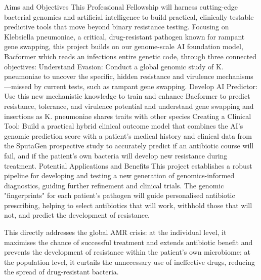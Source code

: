 Aims and Objectives
This Professional Fellowship will harness cutting-edge bacterial genomics and artificial intelligence to build practical, clinically testable predictive tools that move beyond binary resistance testing. Focusing on Klebsiella pneumoniae, a critical, drug-resistant pathogen known for rampant gene swapping, this project builds on our genome-scale AI foundation model, Bacformer which reads an infections entire genetic code, through three connected objectives:
Understand Evasion: Conduct a global genomic study of K. pneumoniae to uncover the specific, hidden resistance and virulence mechanisms—missed by current tests, such as rampant gene swapping.
Develop AI Predictor: Use this new mechanistic knowledge to train and enhance Bacformer to predict resistance, tolerance, and virulence potential and understand gene swapping and insertions as K. pneumoniae shares traits with other species 
Creating a Clinical Tool: Build a practical hybrid clinical outcome model that combines the AI's genomic prediction score with a patient's medical history and clinical data from the SputaGen prospective study to accurately predict if an antibiotic course will fail, and if the patient's own bacteria will develop new resistance during treatment.
Potential Applications and Benefits
This project establishes a robust pipeline for developing and testing a new generation of genomics-informed diagnostics, guiding further refinement and clinical trials. The genomic "fingerprints" for each patient's pathogen will guide personalised antibiotic prescribing, helping to select antibiotics that will work, withhold those that will not, and predict the development of resistance. 

This directly addresses the global AMR crisis: at the individual level, it maximises the chance of successful treatment and extends antibiotic benefit and prevents the development of resistance within the patient's own microbiome; at the population level, it curtails the unnecessary use of ineffective drugs, reducing the spread of drug-resistant bacteria. 